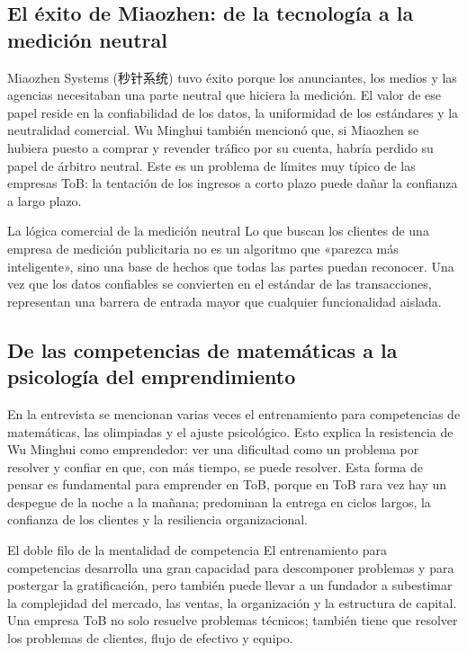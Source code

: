 \subsection{El éxito de Miaozhen: de la tecnología a la medición neutral}

Miaozhen Systems (秒针系统) tuvo éxito porque los anunciantes, los medios y las agencias necesitaban una parte neutral que hiciera la medición. El valor de ese papel reside en la confiabilidad de los datos, la uniformidad de los estándares y la neutralidad comercial. Wu Minghui también mencionó que, si Miaozhen se hubiera puesto a comprar y revender tráfico por su cuenta, habría perdido su papel de árbitro neutral. Este es un problema de límites muy típico de las empresas ToB: la tentación de los ingresos a corto plazo puede dañar la confianza a largo plazo.

\begin{knowledgebox}{La lógica comercial de la medición neutral}
Lo que buscan los clientes de una empresa de medición publicitaria no es un algoritmo que «parezca más inteligente», sino una base de hechos que todas las partes puedan reconocer. Una vez que los datos confiables se convierten en el estándar de las transacciones, representan una barrera de entrada mayor que cualquier funcionalidad aislada.
\end{knowledgebox}

\subsection{De las competencias de matemáticas a la psicología del emprendimiento}

En la entrevista se mencionan varias veces el entrenamiento para competencias de matemáticas, las olimpiadas y el ajuste psicológico. Esto explica la resistencia de Wu Minghui como emprendedor: ver una dificultad como un problema por resolver y confiar en que, con más tiempo, se puede resolver. Esta forma de pensar es fundamental para emprender en ToB, porque en ToB rara vez hay un despegue de la noche a la mañana; predominan la entrega en ciclos largos, la confianza de los clientes y la resiliencia organizacional.

\begin{warningbox}{El doble filo de la mentalidad de competencia}
El entrenamiento para competencias desarrolla una gran capacidad para descomponer problemas y para postergar la gratificación, pero también puede llevar a un fundador a subestimar la complejidad del mercado, las ventas, la organización y la estructura de capital. Una empresa ToB no solo resuelve problemas técnicos; también tiene que resolver los problemas de clientes, flujo de efectivo y equipo.
\end{warningbox}

